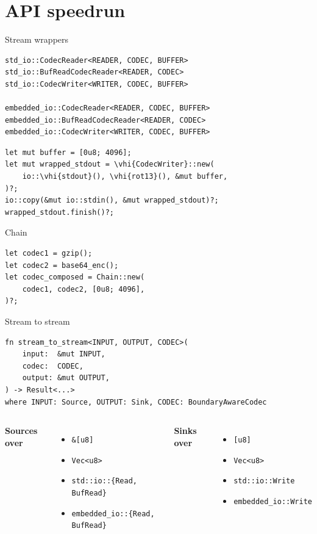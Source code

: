 \documentclass[aspectratio=169,11pt]{beamer}
\newcommand{\vhi}[1]{\mbox{\colorbox{yellow}{#1}}}
\begin{document}
\section{API speedrun}
\frame{\sectionpage}
\begin{frame}[fragile]{Stream wrappers}
\begin{Verbatim}[fontsize=\small]
std_io::CodecReader<READER, CODEC, BUFFER>
std_io::BufReadCodecReader<READER, CODEC>
std_io::CodecWriter<WRITER, CODEC, BUFFER>

embedded_io::CodecReader<READER, CODEC, BUFFER>
embedded_io::BufReadCodecReader<READER, CODEC>
embedded_io::CodecWriter<WRITER, CODEC, BUFFER>
\end{Verbatim}

\medskip
\begin{Verbatim}[fontsize=\small,frame=single,commandchars=\\\{\}]
let mut buffer = [0u8; 4096];
let mut wrapped_stdout = \vhi{CodecWriter}::new(
    io::\vhi{stdout}(), \vhi{rot13}(), &mut buffer,
)?;
io::copy(&mut io::stdin(), &mut wrapped_stdout)?;
wrapped_stdout.finish()?;
\end{Verbatim}
\end{frame}

\begin{frame}[fragile]{Chain}
\begin{Verbatim}[fontsize=\small,frame=single]
let codec1 = gzip();
let codec2 = base64_enc();
let codec_composed = Chain::new(
    codec1, codec2, [0u8; 4096],
)?;
\end{Verbatim}
\end{frame}

\begin{frame}[fragile]{Stream to stream}
\begin{Verbatim}[fontsize=\small,frame=single]
fn stream_to_stream<INPUT, OUTPUT, CODEC>(
    input:  &mut INPUT,
    codec:  CODEC,
    output: &mut OUTPUT,
) -> Result<...>
where INPUT: Source, OUTPUT: Sink, CODEC: BoundaryAwareCodec
\end{Verbatim}

\medskip
\begin{columns}
\textbf{Sources over}
\begin{itemize}
  \item \texttt{\&[u8]}
  \item \texttt{Vec<u8>}
  \item \texttt{std::io::\{Read, BufRead\}}
  \item \texttt{embedded\_io::\{Read, BufRead\}}
\end{itemize}
\textbf{Sinks over}
\begin{itemize}
  \item \texttt{[u8]}
  \item \texttt{Vec<u8>}
  \item \texttt{std::io::Write}
  \item \texttt{embedded\_io::Write}
\end{itemize}
\end{columns}
\end{frame}
\end{document}
